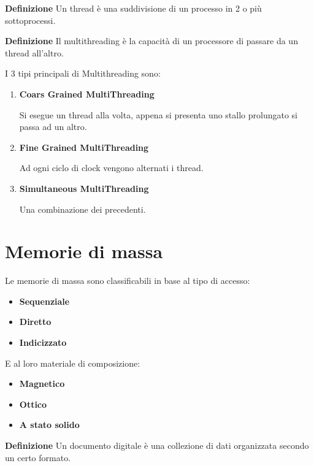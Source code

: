 \documentclass{article}
\begin{document}
\textbf{Definizione} Un thread è una suddivisione di un processo in 2 o più sottoprocessi.\newline

\noindent\textbf{Definizione} Il multithreading è la capacità di un processore di passare da un thread all'altro.\newline

\noindent I 3 tipi principali di Multithreading sono:
\begin{enumerate}
    \item \textbf{Coars Grained MultiThreading}

        Si esegue un thread alla volta, appena si presenta uno stallo prolungato si passa ad un altro.

    \item \textbf{Fine Grained MultiThreading}

        Ad ogni ciclo di clock vengono alternati i thread.

    \item \textbf{Simultaneous MultiThreading}

        Una combinazione dei precedenti.
    
\end{enumerate}

\section{Memorie di massa}

Le memorie di massa sono classificabili in base al tipo di accesso:
\begin{itemize}
    \item \textbf{Sequenziale}
    \item \textbf{Diretto}
    \item \textbf{Indicizzato}
\end{itemize}

\noindent E al loro materiale di composizione:
\begin{itemize}
    \item \textbf{Magnetico}
    \item \textbf{Ottico}
    \item \textbf{A stato solido}\newline
\end{itemize}

\noindent\textbf{Definizione} Un documento digitale è una collezione di dati organizzata secondo un certo formato.\newline
\end{document}
